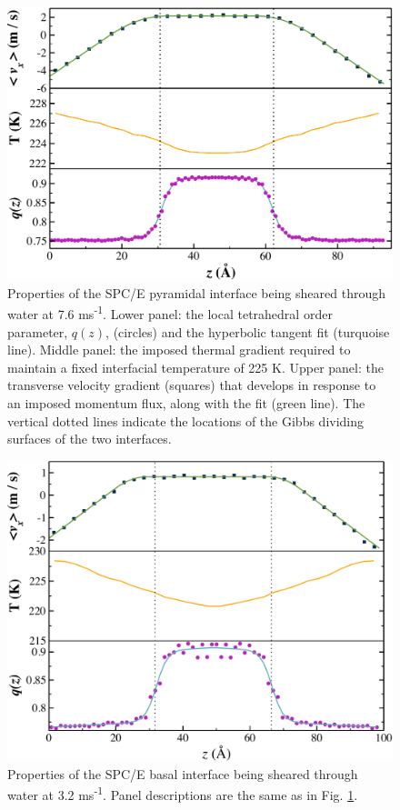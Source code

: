 \begin{figure}
\includegraphics[width=\linewidth]{Figures/Pyr_comic_strip}
\caption{\label{fig:pyrComic} Properties of the SPC/E pyramidal
  interface being sheared through water at 7.6
  ms\textsuperscript{-1}. Lower panel: the local tetrahedral order
  parameter, $q(z)$, (circles) and the hyperbolic tangent fit
  (turquoise line).  Middle panel: the imposed thermal gradient
  required to maintain a fixed interfacial temperature of 225 K. Upper
  panel: the transverse velocity gradient (squares) that develops in
  response to an imposed momentum flux, along with the fit (green
  line). The vertical dotted lines indicate the locations of the Gibbs
  dividing surfaces of the two interfaces.}
\end{figure}

\begin{figure}
\includegraphics[width=\linewidth]{Figures/Bas_comic_strip}
\caption{\label{fig:bComic} Properties of the SPC/E basal interface being
  sheared through water at 3.2 ms\textsuperscript{-1}.  Panel
  descriptions are the same as in Fig. \ref{fig:pyrComic}.}
\end{figure}

